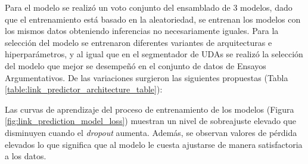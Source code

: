 Para el modelo se realizó un voto conjunto del ensamblado de 3 modelos, dado que el entrenamiento 
está basado en la aleatoriedad, se entrenan los modelos con los mismos datos obteniendo inferencias no
necesariamente iguales.
Para la selección del modelo se entrenaron diferentes variantes de arquitecturas e hiperparámetros, y 
al igual que en el segmentador de UDAs se realizó la selección del modelo que mejor se desempeñó en 
el conjunto de datos de Ensayos Argumentativos. De las variaciones surgieron las siguientes propuestas
(Tabla \ref{table:link_predictor_architecture_table}):

\begin{table}[h!]
	\begin{center}
	\caption{Variantes de arquitectura de los modelos de predicción de enlaces.}\label{table:link_predictor_architecture_table}
	\end{center}
\end{table}

Las curvas de aprendizaje del proceso de entrenamiento de los modelos (Figura \ref{fig:link_prediction_model_loss}) 
muestran un nivel de sobreajuste 
elevado que disminuyen cuando el \emph{dropout} aumenta. Además, se observan valores de pérdida elevados lo que significa 
que al modelo le cuesta ajustarse de manera satisfactoria a los datos.

